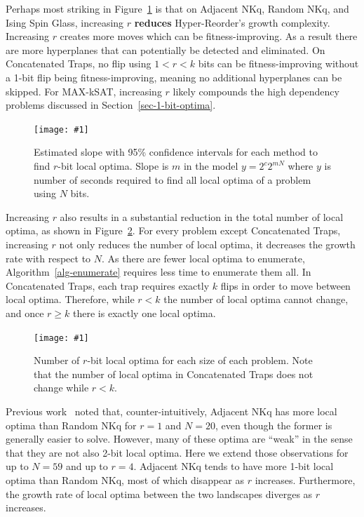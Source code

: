 \documentclass[runningheads,a4paper]{llncs}
\newcommand{\includegraphicsfit}[1]
{\texttt{[image: \#1]}}
\begin{document}
Perhaps most striking in Figure~\ref{fig-slope-method} is that on Adjacent NKq, Random NKq,
and Ising Spin Glass, increasing $r$ \textbf{reduces} Hyper-Reorder's growth complexity.
Increasing $r$ creates more moves which can be fitness-improving. As a result there
are more hyperplanes that can potentially be detected and eliminated.
On Concatenated Traps, no flip using $1 < r < k$ bits can be fitness-improving
without a 1-bit flip being fitness-improving, meaning no additional hyperplanes can be skipped.
For MAX-kSAT, increasing $r$ likely compounds the high dependency problems discussed in
Section~\ref{sec-1-bit-optima}.

\begin{figure}
  \centering
  \includegraphicsfit{slope-method}
  \caption{Estimated slope with 95\% confidence intervals for each method to find $r$-bit local optima. Slope is $m$ in the model $y = 2^c2^{mN}$
           where $y$ is number of seconds required to
	         find all local optima of a problem using $N$ bits.}
  \label{fig-slope-method}
\end{figure}

Increasing $r$ also results in a substantial reduction in the
total number of local optima, as shown in Figure~\ref{fig-length-radius}.
For every problem except Concatenated Traps, increasing $r$ not only reduces the
number of local optima, it decreases the growth rate with respect to $N$. As there
are fewer local optima to enumerate, Algorithm~\ref{alg-enumerate} requires less
time to enumerate them all. In Concatenated Traps, each trap requires exactly $k$ flips in
order to move between local optima. Therefore, while $r < k$ the number of local optima
cannot change, and once $r \ge k$ there is exactly one local optima.

\begin{figure}
  \centering
  \includegraphicsfit{length-radius}
  \caption{Number of $r$-bit local optima for each size of each problem. Note that
           the number of local optima in Concatenated Traps does not change while $r<k$.}
  \label{fig-length-radius}
\end{figure}

Previous work~\cite{ochoa:2015:crossovernetworks} noted that, counter-intuitively, Adjacent
NKq has more local optima than Random NKq for $r=1$ and $N=20$, even though the former is generally
easier to solve. However, many of these optima are ``weak'' in the sense that they are not also
2-bit local optima. Here we extend those observations for up to $N=59$ and up to $r=4$. Adjacent
NKq tends to have more 1-bit local optima than Random NKq, most of which disappear as $r$
increases. Furthermore, the growth rate of local optima between the two landscapes diverges
as $r$ increases.
\end{document}
